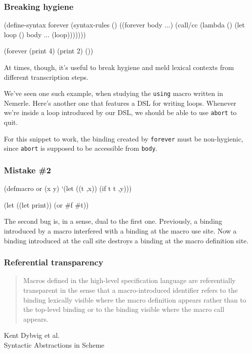 \documentclass[hyperref={bookmarks=false}]{beamer}
\begin{document}
\begin{frame}[fragile]
\frametitle{Breaking hygiene}

\begin{lstlistinglike}
\begin{semiverbatim}
(define-syntax forever
  (syntax-rules ()
    ((forever body ...)
     (call/cc (lambda (\text{\color{red}{abort}})
                (let loop () body ... (loop)))))))

(forever (print 4) (print 2) (\text{\color{blue}{abort}}))
\end{semiverbatim}
\end{lstlistinglike}

At times, though, it's useful to break hygiene and meld lexical contexts
from different transcription steps.

We've seen one such example, when studying the \texttt{using} macro written in Nemerle.
Here's another one that features a DSL for writing loops. Whenever we're inside a loop
introduced by our DSL, we should be able to use \texttt{abort} to quit.

For this snippet to work, the binding created by \texttt{forever} must be non-hygienic,
since \texttt{abort} is supposed to be accessible from \texttt{body}.
\end{frame}

\begin{frame}[fragile]
\frametitle{Mistake \#2}

\begin{lstlistinglike}
\begin{semiverbatim}
(defmacro or (x y)
  `(let ((t ,x))
     (if t t ,y)))

(let ((let print))
  (or \#f \#t))
\end{semiverbatim}
\end{lstlistinglike}

The second bug is, in a sense, dual to the first one. Previously, a binding introduced by a macro
interfered with a binding at the macro use site. Now a binding introduced at the call site destroys
a binding at the macro definition site.
\end{frame}

\begin{frame}[fragile]
\frametitle{Referential transparency}

\begin{quote}
Macros defined in the high-level specification language are referentially
transparent in the sense that a macro-introduced identifier refers to the
binding lexically visible where the macro definition appears rather than to
the top-level binding or to the binding visible where the macro call appears.
\end{quote}

\begin{flushright}
\textemdash Kent Dybvig et al.\\
Syntactic Abstractions in Scheme
\end{flushright}
\end{frame}
\end{document}
